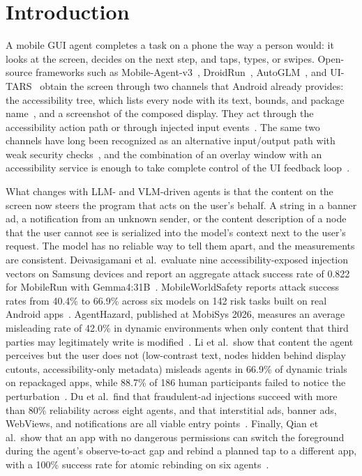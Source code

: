 \section{Introduction}\label{sec:intro}

A mobile GUI agent completes a task on a phone the way a person would: it looks at the screen, decides on the next step, and taps, types, or swipes. Open-source frameworks such as Mobile-Agent-v3~\cite{ye2025mobileagentv3}, DroidRun~\cite{droidrun2025software}, AutoGLM~\cite{liu2024autoglm}, and UI-TARS~\cite{qin2025uitars} obtain the screen through two channels that Android already provides: the accessibility tree, which lists every node with its text, bounds, and package name~\cite{android_accessibilitynodeinfo}, and a screenshot of the composed display. They act through the accessibility action path or through injected input events~\cite{android_accessibilitynodeinfo}. The same two channels have long been recognized as an alternative input/output path with weak security checks~\cite{jang2014a11y}, and the combination of an overlay window with an accessibility service is enough to take complete control of the UI feedback loop~\cite{fratantonio2017cloak}.

What changes with LLM- and VLM-driven agents is that the content on the screen now steers the program that acts on the user's behalf. A string in a banner ad, a notification from an unknown sender, or the content description of a node that the user cannot see is serialized into the model's context next to the user's request. The model has no reliable way to tell them apart, and the measurements are consistent. Deivasigamani et al.\ evaluate nine accessibility-exposed injection vectors on Samsung devices and report an aggregate attack success rate of 0.822 for MobileRun with Gemma4:31B~\cite{deivasigamani2026nota11y}. MobileWorldSafety reports attack success rates from 40.4\% to 66.9\% across six models on 142 risk tasks built on real Android apps~\cite{chen2026mobileworldsafety}. AgentHazard, published at MobiSys 2026, measures an average misleading rate of 42.0\% in dynamic environments when only content that third parties may legitimately write is modified~\cite{liu2026agenthazard}. Li et al.\ show that content the agent perceives but the user does not (low-contrast text, nodes hidden behind display cutouts, accessibility-only metadata) misleads agents in 66.9\% of dynamic trials on repackaged apps, while 88.7\% of 186 human participants failed to notice the perturbation~\cite{li2026uidesync}. Du et al.\ find that fraudulent-ad injections succeed with more than 80\% reliability across eight agents, and that interstitial ads, banner ads, WebViews, and notifications are all viable entry points~\cite{du2025measuringmobileagents}. Finally, Qian et al.\ show that an app with no dangerous permissions can switch the foreground during the agent's observe-to-act gap and rebind a planned tap to a different app, with a 100\% success rate for atomic rebinding on six agents~\cite{qian2026zeropermission}.

